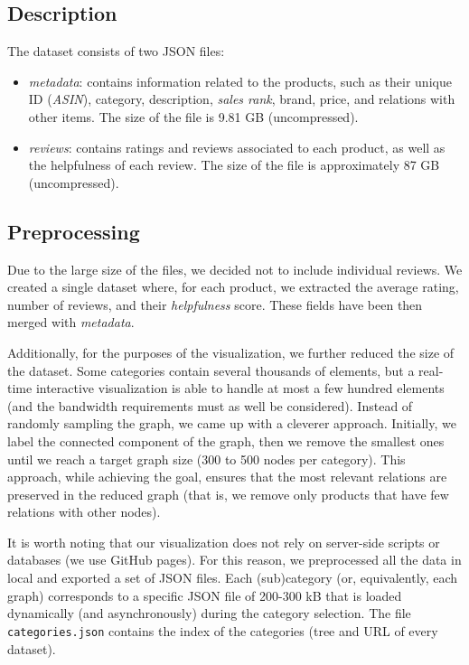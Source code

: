\documentclass[a4paper,12pt]{article}
\begin{document}
\subsection{Description}
The dataset consists of two JSON files:
\begin{itemize}
	\item \textit{metadata}: contains information related to the products, such as their unique ID (\textit{ASIN}), category, description, \textit{sales rank}, brand, price, and  relations with other items. The size of the file is 9.81 GB (uncompressed).
	\item \textit{reviews}: contains ratings and reviews associated to each product, as well as the helpfulness of each review. The size of the file is approximately 87 GB (uncompressed).
\end{itemize}

\subsection{Preprocessing}
Due to the large size of the files, we decided not to include individual reviews. We created a single dataset where, for each product, we extracted the average rating, number of reviews, and their \textit{helpfulness} score. These fields have been then merged with \textit{metadata}.

Additionally, for the purposes of the visualization, we further reduced the size of the dataset. Some categories contain several thousands of elements, but a real-time interactive visualization is able to handle at most a few hundred elements (and the bandwidth requirements must as well be considered). Instead of randomly sampling the graph, we came up with a cleverer approach. Initially, we label the connected component of the graph, then we remove the smallest ones until we reach a target graph size (300 to 500 nodes per category). This approach, while achieving the goal, ensures that the most relevant relations are preserved in the reduced graph (that is, we remove only products that have few relations with other nodes).

It is worth noting that our visualization does not rely on server-side scripts or databases (we use GitHub pages). For this reason, we preprocessed all the data in local and exported a set of JSON files. Each (sub)category (or, equivalently, each graph) corresponds to a specific JSON file of 200-300 kB that is loaded dynamically (and asynchronously) during the category selection. The file \texttt{categories.json} contains the index of the categories (tree and URL of every dataset).
\end{document}
